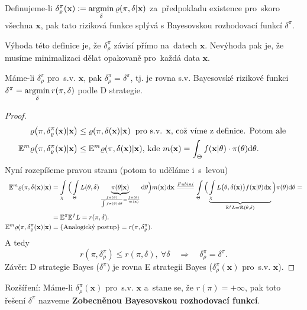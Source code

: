 \begin{define}
Definujeme-li $\delta_\varrho^\pi(\textbf{x}):=\mathop{\mathrm{argmin}}\limits_{\delta}\varrho(\pi,\delta|\textbf{x})$ za~předpokladu existence pro~skoro všechna $\textbf{x}$, pak tato riziková funkce splývá s Bayesovskou rozhodovací funkcí $\delta^\pi$.
\end{define}

\begin{remark}
	Výhoda této definice je, že $\delta_\rho^\pi$ závisí přímo na~datech $\textbf{x}$. Nevýhoda pak je, že musíme minimalizaci dělat opakovaně pro~každá data $\textbf{x}$.
\end{remark}
\begin{theorem}\label{veta_zamena}
	Máme-li $\delta_\rho^\pi$ pro~s.v. $\textbf{x}$, pak $\delta_\rho^\pi=\delta^\pi$, tj. je rovna s.v. Bayesovské rizikové funkci $\delta^\pi=\mathop{\mathrm{argmin}}\limits_\delta r(\pi,\delta)$ podle D strategie.
	\begin{proof}
		\[
		\begin{split}
		\varrho\big(\pi,\delta_\varrho^\pi(\textbf{x})|\textbf{x}\big)&\leq \varrho(\pi,\delta(\textbf{x})|\textbf{x}) \hspace{0.2cm} \text{pro s.v. \textbf{x}, což víme z~definice. Potom ale } \\
		\mathbb{E}^m\varrho\big(\pi,\delta_\varrho^\pi(\textbf{x})|\textbf{x}\big)&\leq \mathbb{E}^m\varrho(\pi,\delta(\textbf{x})|\textbf{x})\text{, kde } m(\textbf{x})=\int_{\Theta}f(\textbf{x}|\theta)\cdot \pi(\theta)\mathrm{d}\theta.
		\end{split}
		\]
		Nyní rozepíšeme pravou stranu (potom to uděláme i~s~levou)
		\[
		\begin{split}
		\E^m\rho(\pi,\delta(\textbf{x})|\textbf{x})&=\int\limits_{\chi}\Big( \int\limits_{\Theta} L(\t,\delta)\underbrace{\pi(\t|\textbf{x})}_{\frac{f\pi(\t)}{\int f\pi(\t)\d\t}=\frac{f\pi(\t)}{m(\textbf{x})}}\d\t\Big)m(\textbf{x})\d\textbf{x}\equal{Fubini}\int\limits_{\Theta}\Big( \underbrace{\int\limits_{\chi} L\big(\t,\delta(\textbf{x})\big)f(\textbf{x}|\t)\d\textbf{x}}_{\E^f L=\RF(\t,\delta)} \Big)\pi(\t)\d\t=\\&=\E^\pi\E^f L=r(\pi,\delta). \\
		\E^m\rho(\pi,\delta_\rho^\pi(\textbf{x})|\textbf{x})&=\{\text{Analogický postup}\}=r(\pi,\delta_\rho^\pi).
		\end{split}
		\]
		A tedy 
		$$ r(\pi,\delta_\rho^\pi)\leq r(\pi,\delta),~\forall\delta\quad \Rightarrow\quad \delta_\rho^\pi=\delta^\pi.$$
		Závěr: D strategie Bayes ($\delta^\pi$) je rovna E strategii Bayes ($\delta_\rho^\pi(\textbf{x})$ pro~s.v. $\textbf{x}$).
	\end{proof} 
\end{theorem}
Rozšíření: Máme-li $\delta_\rho^\pi(\textbf{x})$ pro~s.v. $\textbf{x}$ a~stane se, že $r(\pi)=+\infty$, pak toto řešení $\delta^{\pi}$ nazveme \textbf{Zobecněnou Bayesovskou rozhodovací funkcí}.

